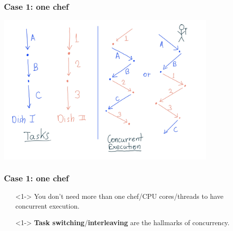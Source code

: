 \documentclass[xcolor={dvipsnames,svgnames},aspectratio=169]{beamer}
\begin{document}
\begin{frame}[fragile]
  \frametitle{Case 1: one chef}

  \begin{center}
    \includegraphics[width=11cm,keepaspectratio]{../media/lecture1-chef.png}
  \end{center}


\end{frame}

\begin{frame}[fragile]
  \frametitle{Case 1: one chef}

  \large{
  \begin{itemize}
  \item[\faBook]<1-> You don't need more than one chef/CPU cores/threads to have
    concurrent execution.
  \item[\faBook]<1-> \textbf{Task switching}/\textbf{interleaving} are the hallmarks of
    concurrency.
  \end{itemize}}
\end{frame}
\end{document}
